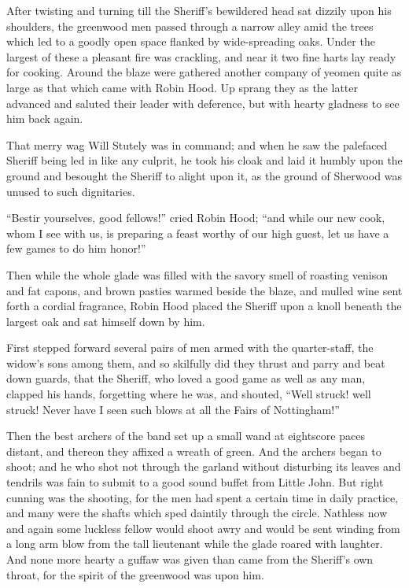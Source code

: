 After twisting and turning till the Sheriff's bewildered head sat
dizzily upon his shoulders, the greenwood men passed through a narrow
alley amid the trees which led to a goodly open space flanked by
wide-spreading oaks. Under the largest of these a pleasant fire was
crackling, and near it two fine harts lay ready for cooking. Around the
blaze were gathered another company of yeomen quite as large as that
which came with Robin Hood. Up sprang they as the latter advanced and
saluted their leader with deference, but with hearty gladness to see him
back again.

That merry wag Will Stutely was in command; and when he saw the
palefaced Sheriff being led in like any culprit, he took his cloak and
laid it humbly upon the ground and besought the Sheriff to alight upon
it, as the ground of Sherwood was unused to such dignitaries.

``Bestir yourselves, good fellows!'' cried Robin Hood; ``and while our
new cook, whom I see with us, is preparing a feast worthy of our high
guest, let us have a few games to do him honor!''

Then while the whole glade was filled with the savory smell of roasting
venison and fat capons, and brown pasties warmed beside the blaze, and
mulled wine sent forth a cordial fragrance, Robin Hood placed the
Sheriff upon a knoll beneath the largest oak and sat himself down by
him.

First stepped forward several pairs of men armed with the quarter-staff,
the widow's sons among them, and so skilfully did they thrust and parry
and beat down guards, that the Sheriff, who loved a good game as well as
any man, clapped his hands, forgetting where he was, and shouted, ``Well
struck! well struck! Never have I seen such blows at all the Fairs of
Nottingham!''

Then the best archers of the band set up a small wand at eightscore
paces distant, and thereon they affixed a wreath of green. And the
archers began to shoot; and he who shot not through the garland without
disturbing its leaves and tendrils was fain to submit to a good sound
buffet from Little John. But right cunning was the shooting, for the men
had spent a certain time in daily practice, and many were the shafts
which sped daintily through the circle. Nathless now and again some
luckless fellow would shoot awry and would be sent winding from a long
arm blow from the tall lieutenant while the glade roared with laughter.
And none more hearty a guffaw was given than came from the Sheriff's own
throat, for the spirit of the greenwood was upon him.

